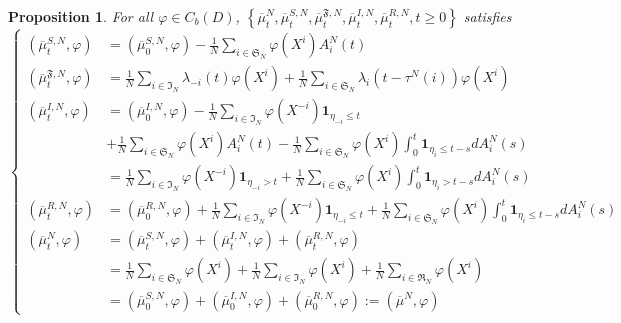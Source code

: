 \documentclass[notitlepage,reqno,11pt]{amsart}
\numberwithin{equation}{section}
\newtheorem{propo}{Proposition}[section]
\begin{document}
\begin{propo}
	For all $\varphi \in C_b(D)$, $\left\{\overline{\mu}_t^{N}, \overline{\mu}_t^{S,N},\overline{\mu}_t^{\mathfrak{F},N},\overline{\mu}_t^{I,N}, \overline{\mu}_t^{R,N}, t\geq 0 \right\}$ satisfies
	\begin{equation}
	\label{equa2}
	\left\lbrace
	\begin{aligned}
	(\overline{\mu}_t^{S,N},\varphi)&= (\overline{\mu}_0^{S,N},\varphi)
	-\frac{1}{N} \sum_{i\in\mathfrak{S}_N}\varphi(X^{i})A^N_i(t)\\
	(\overline{\mu}_t^{\mathfrak{F},N},\varphi) &= \frac{1}{N} \sum_{i\in \mathfrak{I}_N} \lambda_{-i}(t)\varphi({X^{i}}) +\frac{1}{N} \sum_{i\in \mathfrak{S}_N} \lambda_{i}(t- \tau^N(i))\varphi({X^{i}})\\
	(\overline{\mu}_t^{I,N},\varphi)&= (\overline{\mu}_0^{I,N},\varphi)- \frac{1}{N}\sum_{i\in\mathfrak{I}_N}\varphi(X^{-i})\mathbf{1}_{\eta_{-i}\leq t}\\
	&+\frac{1}{N} \sum_{i\in\mathfrak{S}_N}\varphi(X^{i})A^N_i(t)- \frac{1}{N} \sum_{i\in\mathfrak{S}_N}\varphi(X^{i})\int_0^t\mathbf{1}_{\eta_i\leq t-s}dA^N_i(s)\\
	&= \frac{1}{N}\sum_{i\in\mathfrak{I}_N}\varphi(X^{-i})\mathbf{1}_{\eta_{-i}> t}+
	\frac{1}{N} \sum_{i\in\mathfrak{S}_N}\varphi(X^{i})\int_0^t\mathbf{1}_{\eta_i> t-s}dA^N_i(s)\\
	(\overline{\mu}_t^{R,N},\varphi)&= (\overline{\mu}_0^{R,N},\varphi)+ \frac{1}{N}\sum_{i\in\mathfrak{I}_N}\varphi(X^{-i})\mathbf{1}_{\eta_{-i}\leq t}+\frac{1}{N} \sum_{i\in\mathfrak{S}_N}\varphi(X^{i})\int_0^t\mathbf{1}_{\eta_i\leq t-s}dA^N_i(s)\\
	(\overline{\mu}_t^{N},\varphi)&=(\overline{\mu}_t^{S,N},\varphi)+(\overline{\mu}_t^{I,N},\varphi)+(\overline{\mu}_t^{R,N},\varphi)\\
	&=\frac{1}{N}\sum_{i\in\mathfrak{S}_N} \varphi(X^{i})+ \frac{1}{N}\sum_{i\in\mathfrak{I}_N}\varphi(X^{i})+ \frac{1}{N}\sum_{i\in\mathfrak{R}_N}\varphi(X^{i})\\
	&=(\overline{\mu}_0^{S,N},\varphi)+(\overline{\mu}_0^{I,N},\varphi)+(\overline{\mu}_0^{R,N},\varphi):=(\overline{\mu}^{N},\varphi)
\end{aligned}
	\right.
	\end{equation}	
\end{propo}
\end{document}
